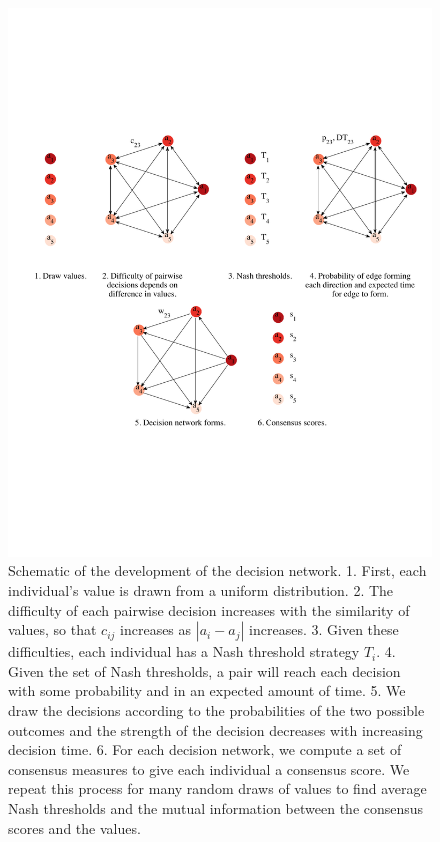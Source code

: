 \documentclass{article}
\begin{document}
\begin{figure}[ht]
\includegraphics[width=6.83in]{cartoon_cropped.pdf}
\caption{\label{cartoon} Schematic of the development of the decision network. 1. First, each individual's value is drawn from a uniform distribution. 2. The difficulty of each pairwise decision increases with the similarity of values, so that $c_{ij}$ increases as $|a_i-a_j|$ increases. 3. Given these difficulties, each individual has a Nash threshold strategy $T_i$. 4. Given the set of Nash thresholds, a pair will reach each decision with some probability and in an expected amount of time. 5. We draw the decisions according to the probabilities of the two possible outcomes and the strength of the decision decreases with increasing decision time. 6. For each decision network, we compute a set of consensus measures to give each individual a consensus score. We repeat this process for many random draws of values to find average Nash thresholds and the mutual information between the consensus scores and the values. }
\end{figure}
\end{document}
